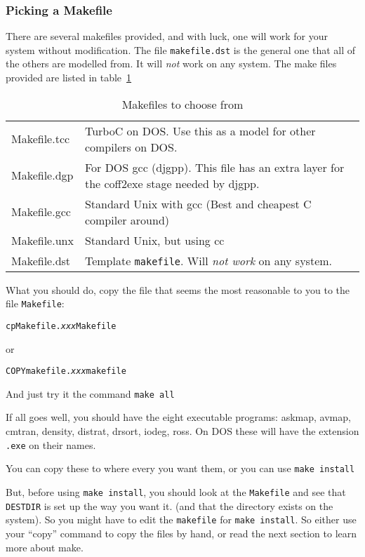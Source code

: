 \documentclass[%
	11pt,
        a4paper,
        twoside]{workrep}
\newcommand*{\prg}[1]{\textsf{#1}}		%
\newcommand*{\cmd}[1]{\texttt{#1}}		%
\newcommand*{\file}[1]{\texttt{#1}}		%
\begin{document}
\subsubsection{Picking a Makefile}\label{sec:pickmake}

There are several makefiles provided, and with luck, one will work
for your system without modification.  The file \file{makefile.dst} is
the general one that all of the others are modelled from.  It will
\emph{not} work on any system.  The make files provided are listed
in table~\ref{tab:makefiles}
\begin{table}
\begin{center}
\begin{tabular}{>{\ttfamily}lp{7.5cm}}
	Makefile.tcc &	TurboC on DOS.  Use this as a model for
			other compilers on DOS.\\
	Makefile.dgp &  For DOS \prg{gcc} (\prg{djgpp}).  This file has
			an extra layer for the \prg{coff2exe}
			stage needed by \prg{djgpp}. \\
	Makefile.gcc &	Standard Unix with \prg{gcc} (Best and cheapest
                        C compiler around) \\
	Makefile.unx &	Standard Unix, but using \prg{cc}\\
	Makefile.dst &	Template \file{makefile}.  Will \emph{not work}
			on any system.
\end{tabular}
\end{center}
\caption{Makefiles to choose from}\label{tab:makefiles}
\end{table}

What you should do, copy the file that seems the most reasonable to
you to the file \file{Makefile}:

\begin{alltt}
  cp Makefile.\textit{xxx} Makefile
\end{alltt}
or
\begin{alltt}
  COPY makefile.\textit{xxx} makefile
\end{alltt}

And just try it the command \cmd{make all}

If all goes well, you should have the eight executable programs:
\prg{askmap}, \prg{avmap}, \prg{cmtran}, \prg{density}, \prg{distrat},
\prg{drsort}, \prg{iodeg}, \prg{ross}.  On DOS these will have
the extension \file{.exe} on their names.

You can copy these to where every you want them, or you can use
\cmd{make install}

But, before using \cmd{make install}, you should look at the \file{Makefile}
and see that \texttt{DESTDIR} is set up the way you want it.  (and that
the directory exists on the system).  So you might have to
edit the \file{makefile} for \cmd{make install}.  So either use your
``copy'' command to copy the files by hand, or read the next section
to learn more about \prg{make}.
  
\end{document}
